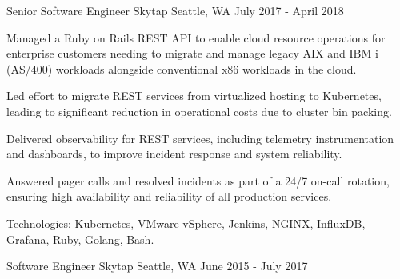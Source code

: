 \begin{cventries}
  \cventry
    {Senior Software Engineer} %
    {Skytap} %
    {Seattle, WA} %
    {July 2017 - April 2018} %
    {
      \begin{cvitems} %
        \item {Managed a Ruby on Rails REST API to enable cloud resource operations for enterprise customers needing to migrate and manage legacy AIX and IBM i (AS/400) workloads alongside conventional x86 workloads in the cloud.}
        \item {Led effort to migrate REST services from virtualized hosting to Kubernetes, leading to significant reduction in operational costs due to cluster bin packing.}
        \item {Delivered observability for REST services, including telemetry instrumentation and dashboards, to improve incident response and system reliability.}
        \item {Answered pager calls and resolved incidents as part of a 24/7 on-call rotation, ensuring high availability and reliability of all production services.}
        \item {Technologies: Kubernetes, VMware vSphere, Jenkins, NGINX, InfluxDB, Grafana, Ruby, Golang, Bash.}
      \end{cvitems}
    }

  \cventry
    {Software Engineer} %
    {Skytap} %
    {Seattle, WA} %
    {June 2015 - July 2017} %
    {}

\end{cventries}
